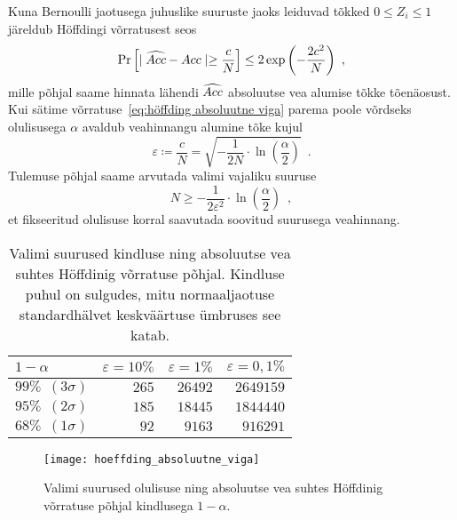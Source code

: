 Kuna Bernoulli jaotusega juhuslike suuruste jaoks leiduvad tõkked $0 \leq Z_i \leq 1$ järeldub Höffdingi võrratusest seos
\begin{equation}
    \label{eq:höffding absoluutne viga}
    \Pr\left[\mid \widehat{Acc} - Acc \mid \geq \frac{c}{N}\right] \leq 2 \exp{\left( - \frac{2 c^2}{N} \right)} \enspace,
\end{equation}
mille põhjal saame hinnata lähendi $\widehat{Acc}$ absoluutse vea alumise tõkke tõenäosust. Kui sätime võrratuse~\eqref{eq:höffding absoluutne viga} parema poole võrdseks olulisusega $\alpha$ avaldub veahinnangu alumine tõke kujul
\begin{equation*}
     \varepsilon \coloneqq \frac{c}{N} = \sqrt{- \frac{1}{2 N} \cdot \ln{\left( \frac{\alpha}{2} \right)}} \enspace.
\end{equation*}
Tulemuse põhjal saame arvutada valimi vajaliku suuruse
\begin{equation*}
    N \geq - \frac{1}{2 \varepsilon^2} \cdot \ln{\left( \frac{\alpha}{2} \right)} \enspace,
\end{equation*}
et fikseeritud olulisuse korral saavutada soovitud suurusega veahinnang.

\begin{table}[H]
    \centering
    \caption{Valimi suurused kindluse ning absoluutse vea suhtes Höffdinig võrratuse põhjal. Kindluse puhul on sulgudes, mitu normaaljaotuse standardhälvet keskväärtuse ümbruses see katab.}
    \begin{tabular}{l | r r r}
        $1-\alpha$ & $\varepsilon=10\%$ & $\varepsilon=1\%$ & $\varepsilon=0{,}1\%$ \\
    	\hline
    	$99\% \enspace (3\sigma)$ & $265$ & $26492$ & $2649159$ \\
    	$95\% \enspace (2\sigma)$ & $185$ & $18445$ & $1844440$ \\
    	$68\% \enspace (1\sigma)$ & $92$  & $9163$  & $916291$  \\
    \end{tabular}
    \label{tab:höffding absoluutne viga}
\end{table}

\begin{figure}[H]
    \begin{center}
        \texttt{[image: hoeffding\_absoluutne\_viga]}
    \end{center}
    \caption{Valimi suurused olulisuse ning absoluutse vea suhtes Höffdinig võrratuse põhjal kindlusega $1-\alpha$.}
    \label{fig:höffding absoluutne viga}
\end{figure}

